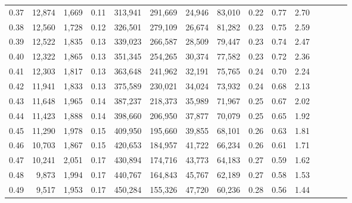 \begin{tabular}{rrrcrrrrrrrrrrr}
0.37 &  12,874 &  1,669 &                                       0.11 &  313,941 &  291,669 &   24,946 &   83,010 &  0.22 &  0.77 &                         2.70 \\
0.38 &  12,560 &  1,728 &                                       0.12 &  326,501 &  279,109 &   26,674 &   81,282 &  0.23 &  0.75 &                         2.59 \\
0.39 &  12,522 &  1,835 &                                       0.13 &  339,023 &  266,587 &   28,509 &   79,447 &  0.23 &  0.74 &                         2.47 \\
0.40 &  12,322 &  1,865 &                                       0.13 &  351,345 &  254,265 &   30,374 &   77,582 &  0.23 &  0.72 &                         2.36 \\
0.41 &  12,303 &  1,817 &                                       0.13 &  363,648 &  241,962 &   32,191 &   75,765 &  0.24 &  0.70 &                         2.24 \\
0.42 &  11,941 &  1,833 &                                       0.13 &  375,589 &  230,021 &   34,024 &   73,932 &  0.24 &  0.68 &                         2.13 \\
0.43 &  11,648 &  1,965 &                                       0.14 &  387,237 &  218,373 &   35,989 &   71,967 &  0.25 &  0.67 &                         2.02 \\
0.44 &  11,423 &  1,888 &                                       0.14 &  398,660 &  206,950 &   37,877 &   70,079 &  0.25 &  0.65 &                         1.92 \\
0.45 &  11,290 &  1,978 &                                       0.15 &  409,950 &  195,660 &   39,855 &   68,101 &  0.26 &  0.63 &                         1.81 \\
0.46 &  10,703 &  1,867 &                                       0.15 &  420,653 &  184,957 &   41,722 &   66,234 &  0.26 &  0.61 &                         1.71 \\
0.47 &  10,241 &  2,051 &                                       0.17 &  430,894 &  174,716 &   43,773 &   64,183 &  0.27 &  0.59 &                         1.62 \\
0.48 &   9,873 &  1,994 &                                       0.17 &  440,767 &  164,843 &   45,767 &   62,189 &  0.27 &  0.58 &                         1.53 \\
0.49 &   9,517 &  1,953 &                                       0.17 &  450,284 &  155,326 &   47,720 &   60,236 &  0.28 &  0.56 &                         1.44 \\

\end{tabular}
